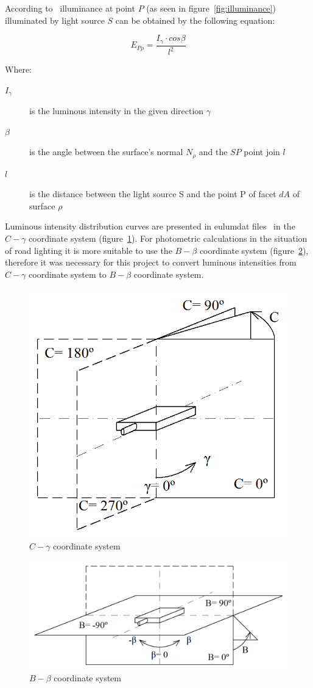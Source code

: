According to~\cite{Habel} illuminance at point $P$ (as seen in figure~\ref{fig:illuminance}) illuminated by light source $S$ can be obtained by the following equation:

\begin{equation}
E_{P\rho}=\frac{I_{\gamma} \cdot cos \beta}{l^2}
\end{equation}

Where:
\begin{description}
	\item[$I_{\gamma}$] is the luminous intensity in the given direction $\gamma$
	\item[$\beta$] is the angle between the surface's normal $N_{\rho}$ and the $SP$ point join $l$
	\item[$l$] is the distance between the light source S and the point P of facet $dA$ of surface $\rho$
\end{description}

Luminous intensity distribution curves are presented in eulumdat files~\cite{Eulumdat} in the $C-\gamma$ coordinate system (figure~\ref{fig:Cgamma}). For photometric calculations in the situation of road lighting it is more suitable to use the $B-\beta$ coordinate system (figure~\ref{fig:Bbeta}), therefore it was necessary for this project to convert luminous intensities from $C-\gamma$ coordinate system to $B-\beta$ coordinate system.

\begin{figure}[htb]
  \centering
  \includegraphics[width=0.7\columnwidth]{Cgama}
  \caption{$C-\gamma$ coordinate system}
  \label{fig:Cgamma}
\end{figure}

\begin{figure}[htb]
  \centering
  \includegraphics[width=\columnwidth]{Bbeta}
  \caption{$B-\beta$ coordinate system}
  \label{fig:Bbeta}
\end{figure}